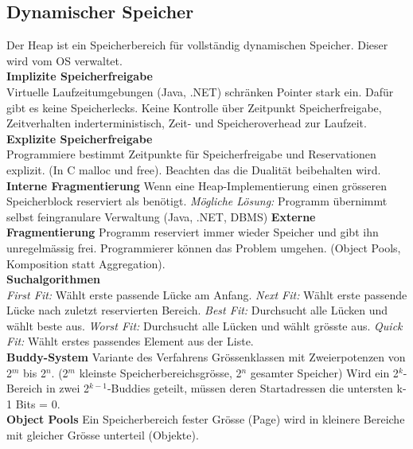 \documentclass[7pt,landscape,a4paper]{scrartcl}
\begin{document}
\begin{multicols*}{4}
\subsection{Dynamischer Speicher}
\vspace{-0.75em}
Der Heap ist ein Speicherbereich für vollständig dynamischen Speicher. Dieser wird vom OS verwaltet.\\ 
\textbf{Implizite Speicherfreigabe}\\
Virtuelle Laufzeitumgebungen (Java, .NET) schränken Pointer stark ein. Dafür gibt es keine Speicherlecks. Keine Kontrolle über Zeitpunkt Speicherfreigabe,
Zeitverhalten inderterministisch,
Zeit- und Speicheroverhead zur Laufzeit.\\
\textbf{Explizite Speicherfreigabe}\\
Programmiere bestimmt Zeitpunkte für Speicherfreigabe und Reservationen explizit. (In C malloc und free). Beachten das die Dualität beibehalten wird.
\textbf{Interne Fragmentierung} Wenn eine Heap-Implementierung einen grösseren Speicherblock reserviert als benötigt. \textit{Mögliche Lösung:} Programm übernimmt selbst feingranulare Verwaltung (Java, .NET, DBMS) \textbf{Externe Fragmentierung} Programm reserviert immer wieder Speicher und gibt ihn unregelmässig frei. Programmierer können das Problem umgehen. (Object Pools, Komposition statt Aggregation).\\
\textbf{Suchalgorithmen}\\
\textit{First Fit:} Wählt erste passende Lücke am Anfang. \textit{Next Fit:} Wählt erste passende Lücke nach zuletzt reservierten Bereich. \textit{Best Fit:} Durchsucht alle Lücken und wählt beste aus. \textit{Worst Fit:} Durchsucht alle Lücken und wählt grösste aus. \textit{Quick Fit:} Wählt erstes passendes Element aus der Liste.\\
\textbf{Buddy-System} Variante des Verfahrens Grössenklassen mit Zweierpotenzen von 2$^{m}$ bis 2$^{n}$. (2$^{m}$ kleinste Speicherbereichsgrösse, 2$^{n}$ gesamter Speicher) Wird ein 2$^{k}$-Bereich in zwei 2$^{k-1}$-Buddies geteilt, müssen deren Startadressen die untersten k-1 Bits = 0.\\
\textbf{Object Pools} Ein Speicherbereich fester Grösse (Page) wird in kleinere Bereiche mit gleicher Grösse unterteil (Objekte).


\end{multicols*}
\end{document}
